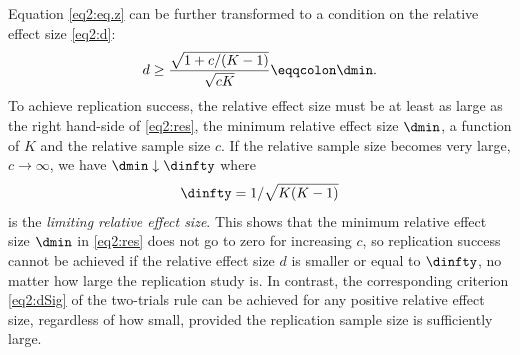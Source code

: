 Equation \eqref{eq2:eq.z} can be further transformed to a
condition on the relative effect size \eqref{eq2:d}:
\begin{equation}\label{eq2:res}
  d \geq  \frac{\sqrt{1+c/(K-1)}}{ \sqrt{c K}} \eqqcolon \dmin .
\end{equation}
To achieve replication success, the relative effect size must be at least as
large as the right hand-side of \eqref{eq2:res}, the minimum relative effect size
$\dmin$, a function of $K$ and the relative sample size $c$. If the relative
sample size becomes very large, \ie $c \rightarrow \infty$, we have
$\dmin \downarrow \dinfty$ where
\begin{equation}\label{eq2:smallestpossible}
  \dinfty = 1/\sqrt{K (K-1)}
\end{equation}
is the \textit{limiting relative effect size}. This shows that the minimum
relative effect size $\dmin$ in \eqref{eq2:res} does not go to zero for
increasing $c$, so replication success cannot be achieved if the relative effect
size $d$ is smaller or equal to $\dinfty$, no matter how large the replication
study is. In contrast, the corresponding criterion \eqref{eq2:dSig} of the
two-trials rule can be achieved for any positive relative effect size,
regardless of how small, provided the replication sample size is sufficiently
large.


